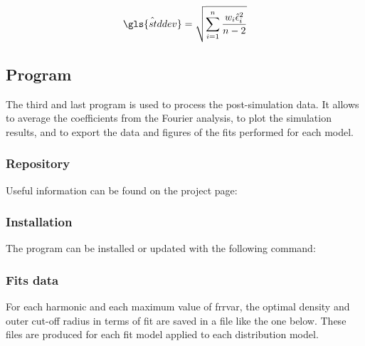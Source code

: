 \begin{equation}\label{eq:fit-standard-error}
\hat{\gls{stddev}} = \sqrt{\sum_{i=1}^n \frac{w_i \hat{\epsilon}_i^2}{n-2}}
\end{equation}

\newpage

\subsection{Program}

The third and last program is used to process the post-simulation data.
It allows to average the coefficients from the Fourier analysis, to plot the simulation results, and to export the data and figures of the fits performed for each model.

\subsubsection{Repository}

Useful information can be found on the project page: 

\subsubsection{Installation}

The program can be installed or updated with the following command:


\subsubsection{Fits data}

For each harmonic and each maximum value of \gls{frrvar}, the optimal density and outer cut-off radius in terms of fit are saved in a file like the one below. These files are produced for each fit model applied to each distribution model.

\medskip


